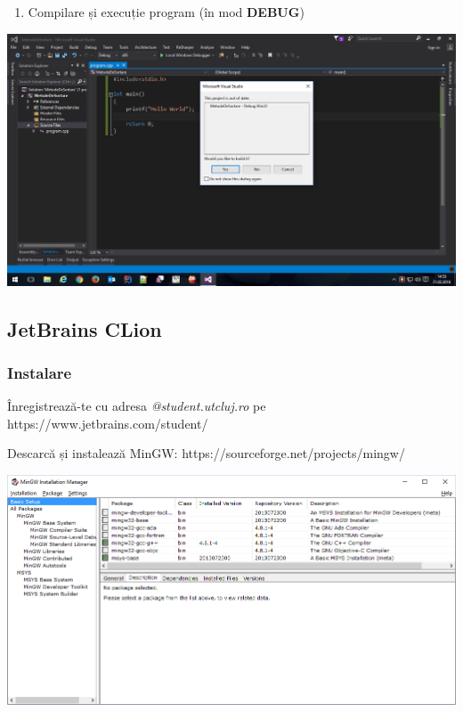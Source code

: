 \documentclass[../ro-fa-lab.tex]{subfiles}
\begin{document}
\begin{enumerate}
\def\labelenumi{\arabic{enumi}.}
\setcounter{enumi}{4}
\item
  Compilare și execuție program (în mod \textbf{DEBUG})
\end{enumerate}

\includegraphics[width=\textwidth]{../Resources/lab0/image6.png}


\subsection{JetBrains CLion}\label{jetbrains-clion}

\subsubsection{Instalare}\label{instalare-1}

Înregistrează-te cu adresa \emph{@student.utcluj.ro} pe
https://www.jetbrains.com/student/

Descarcă și instalează MinGW: https://sourceforge.net/projects/mingw/

\includegraphics[width=\textwidth]{../Resources/lab0/image7.png}
\end{document}
